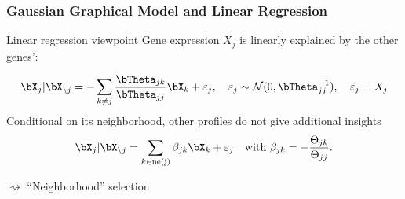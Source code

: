 \begin{frame}
  \frametitle{Gaussian Graphical Model and Linear Regression}

  \begin{block}{Linear regression viewpoint}
    Gene expression $X_j$ is linearly explained by the other genes':

    \begin{equation*}
      \bX_j | \bX_{ \setminus j} = - \sum_{k \neq j}
      \frac{\invcov_{jk}}{\invcov_{jj}} \bX_{k} + \varepsilon_j,\quad \varepsilon_j
      \sim \mathcal{N}(0,\invcov_{jj}^{-1}), \quad \varepsilon_j \perp X_j
      \end{equation*}
      Conditional  on its  neighborhood,  other profiles  do not  give additional insights
    \begin{equation*}
      \bX_j | \bX_{ \setminus j} =
       \sum_{k \in \text{ne(j)}} \beta_{jk} \bX_k + \varepsilon_j
      \quad         \text{with         }         \beta_{jk}         =
      -\frac{\Theta_{jk}}{\Theta_{jj}}.
    \end{equation*}
  \end{block}


  \vfill
  \alert{$\rightsquigarrow$ ``Neighborhood'' selection}

\end{frame}

